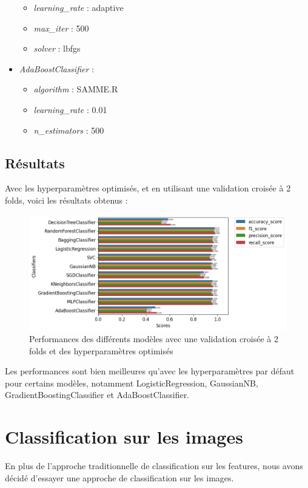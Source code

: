 \documentclass{article}
\begin{document}
\begin{footnotesize}
\begin{multicols}{2}
\begin{itemize}
\begin{itemize}
        \item \textit{learning\_rate} : adaptive
        \item \textit{max\_iter} : 500
        \item \textit{solver} : lbfgs
    \end{itemize}
    \item \textit{AdaBoostClassifier} :
    \begin{itemize}
        \item \textit{algorithm} : SAMME.R
        \item \textit{learning\_rate} : 0.01
        \item \textit{n\_estimators} : 500
    \end{itemize}
\end{itemize}
\end{multicols}
\end{footnotesize}

\subsection{Résultats}
Avec les hyperparamètres optimisés, et en utilisant une validation croisée à 2 folds,
voici les résultats obtenus :

\begin{figure}[h]
    \centering
    \includegraphics[width=1.2\textwidth]{img/all_perfs_with_cv_and_best_hp.png}
    \caption{Performances des différents modèles avec une validation croisée à 2 folds et des hyperparamètres optimisés}
\end{figure}

Les performances sont bien meilleures qu'avec les hyperparamètres par défaut pour certains
modèles, notamment LogisticRegression, GaussianNB, GradientBoostingClassifier
et AdaBoostClassifier.

\newpage
\section{Classification sur les images}
En plus de l'approche traditionnelle de classification sur les features, nous avons
décidé d'essayer une approche de classification sur les images. 
\end{document}
